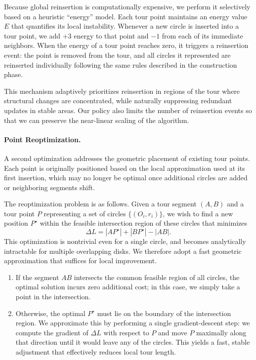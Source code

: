 \documentclass[11pt]{article}
\begin{document}
Because global reinsertion is computationally expensive, we perform it selectively based on a heuristic “energy” model. Each tour point maintains an energy value $E$ that quantifies its local instability. Whenever a new circle is inserted into a tour point, we add $+3$ energy to that point and $-1$ from each of its immediate neighbors. When the energy of a tour point reaches zero, it triggers a reinsertion event: the point is removed from the tour, and all circles it represented are reinserted individually following the same rules described in the construction phase.

This mechanism adaptively prioritizes reinsertion in regions of the tour where structural changes are concentrated, while naturally suppressing redundant updates in stable areas. Our policy also limits the number of reinsertion events so that we can preserve the near-linear scaling of the algorithm.

\paragraph{Point Reoptimization.}
A second optimization addresses the geometric placement of existing tour points. Each point is originally positioned based on the local approximation used at its first insertion, which may no longer be optimal once additional circles are added or neighboring segments shift.

The reoptimization problem is as follows. Given a tour segment $(A,B)$ and a tour point $P$ representing a set of circles $\{(O_i, r_i)\}$, we wish to find a new position $P^\star$ within the feasible intersection region of these circles that minimizes
\[
\Delta L = |A P^\star| + |B P^\star| - |A B|.
\]
This optimization is nontrivial even for a single circle, and becomes analytically intractable for multiple overlapping disks. We therefore adopt a fast geometric approximation that suffices for local improvement.

\begin{enumerate}
    \item If the segment $AB$ intersects the common feasible region of all circles, the optimal solution incurs zero additional cost; in this case, we simply take a point in the intersection.
    \item Otherwise, the optimal $P^\star$ must lie on the boundary of the intersection region. We approximate this by performing a single gradient-descent step: we compute the gradient of $\Delta L$ with respect to $P$ and move $P$ maximally along that direction until it would leave any of the circles. This yields a fast, stable adjustment that effectively reduces local tour length.
\end{enumerate}
\end{document}
